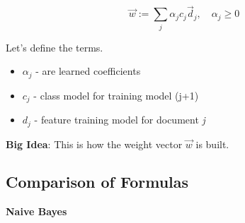 \documentclass{article}
\begin{document}
\[
    \vec{w} := \sum_j \alpha_j c_j \vec{d}_j, \quad \alpha_j \geq 0
\]

Let's define the terms.

\begin{itemize}
    \item{$\alpha_{j}$ - are learned coefficients}
    \item $c_j$ - class model for training model (j+1)
    \item $d_j$ - feature training model for document \textit{j}
\end{itemize}

\textbf{Big Idea}: This is how the weight vector $\vec{w}$ is built.


\subsection{Comparison of Formulas}

\textbf{Naive Bayes}
\end{document}
